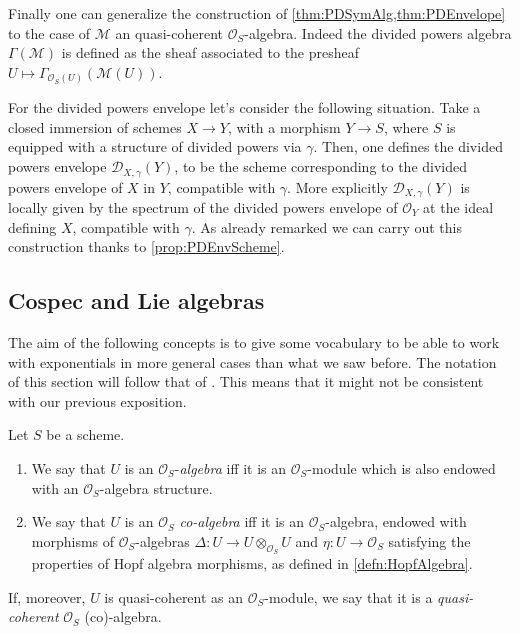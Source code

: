 \begin{rem}[]
	Finally one can generalize the construction
	of \cref{thm:PDSymAlg,thm:PDEnvelope} to the case of $\mathcal{M}$
	an quasi-coherent $\mathcal{O}_{ S }$-algebra.
	Indeed the divided powers algebra $\Gamma(\mathcal{M})$ is defined
	as the sheaf associated to the presheaf 
	$U \mapsto \Gamma_{\mathcal{O}_S(U)}(\mathcal{M}(U))$.

	For the divided powers envelope let's consider the following situation.
	Take a closed immersion of schemes $X \to Y$, with a morphism $Y \to S$,
	where $S$ is equipped with a structure of divided powers via $\gamma$.
	Then, one defines the
	divided powers envelope $\mathcal{D}_{X,\gamma}(Y)$, to be the scheme
	corresponding to the divided powers envelope of $X$ in $Y$,
	compatible with $\gamma$.
	More explicitly $\mathcal{D}_{X,\gamma}(Y)$ is locally 
	given by the spectrum of the divided powers envelope
	of $\mathcal{O}_{ Y }$ at the ideal defining $X$, compatible with $\gamma$.
	As already remarked we can carry out this construction
	thanks to \cref{prop:PDEnvScheme}.
\end{rem}


\subsection{Cospec and Lie algebras}
The aim of the following concepts is to give some vocabulary to
be able to work with exponentials in more general cases than what we saw before.
The notation of this section will follow that of \cite[Capther III]{Messing}.
This means that it might not be consistent with our previous exposition.


\begin{defn}
	Let $S$ be a scheme.
\begin{enumerate}
\item We say that $U$ is an $\mathcal{O}_{ S }$-{\em algebra}
	iff it is an $\mathcal{O}_{ S }$-module
	which is also endowed with an $\mathcal{O}_{ S }$-algebra structure.
\item We say that $U$ is an $\mathcal{O}_{ S }$ {\em co-algebra}
	iff it is an $\mathcal{O}_{ S }$-algebra, endowed with
	morphisms of $\mathcal{O}_S$-algebras
	$\Delta\colon U \to U \otimes_{\mathcal{O}_{ S }} U$
	and $\eta\colon U \to \mathcal{O}_{ S }$
	satisfying the properties of Hopf algebra morphisms,
	as defined in \cref{defn:HopfAlgebra}.
\end{enumerate}
	If, moreover, $U$ is quasi-coherent as an $\mathcal{O}_{ S }$-module,
	we say that it is a {\em quasi-coherent} $\mathcal{O}_{ S }$ (co)-algebra.
\end{defn}


